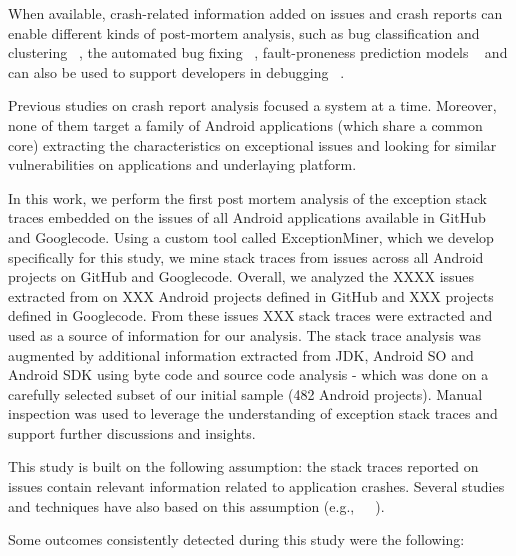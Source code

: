 \documentclass[conference]{IEEEtran}
\begin{document}
When available, crash-related information added on issues and crash reports can enable different kinds of post-mortem analysis, such as
 bug classification and clustering ~\cite{wang2013improving, kim2011crash, dhaliwal2011classifying},  the automated bug fixing ~\cite{sinha2009fault},  
fault-proneness prediction models ~\cite{kim2013predicting} and can also be used to support developers in debugging ~\cite{schroter2010stack}. 

Previous studies on crash report analysis focused a system 
at a time. Moreover, none of them target a family of Android applications (which share a common core) extracting 
the characteristics on exceptional issues and looking for similar vulnerabilities on applications and underlaying platform.

In this work, we perform the first post mortem analysis of the exception stack traces embedded on the issues
of all Android applications available in GitHub and Googlecode. Using a custom tool called ExceptionMiner,
 which we develop specifically for this study, we mine stack traces from issues across all Android projects on
GitHub and Googlecode. Overall, we analyzed the XXXX issues extracted from on XXX Android projects defined in
GitHub and XXX projects defined in Googlecode. From these issues  XXX stack traces were extracted and used as
 a source of information for our analysis. The stack trace analysis was augmented by additional information
extracted from JDK, Android SO and Android SDK using byte code and source code analysis - which was done 
on a carefully selected subset of our initial sample (482 Android projects). Manual inspection was
used to leverage the understanding of exception stack traces and support further discussions and insights.


This study is built on the following assumption: the stack traces reported on issues contain 
relevant information related to application crashes. Several studies and techniques have also based on this assumption (e.g.,~\cite{sinha2009fault}~\cite{dhaliwal2011classifying}~\cite{kim2013predicting}).

Some outcomes consistently detected during this study were the following:
\end{document}
